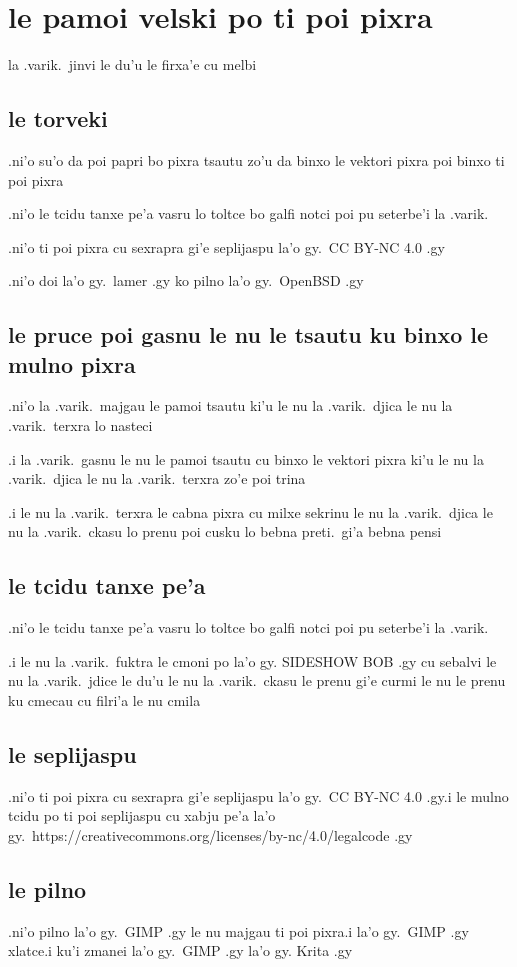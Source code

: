 \documentclass{report}
\begin{document}
\section{le pamoi velski po ti poi pixra}
la .varik.\ jinvi le du'u le firxa'e cu melbi
\subsection{le torveki}
.ni'o su'o da poi papri bo pixra tsautu zo'u da binxo le vektori pixra poi binxo ti poi pixra

.ni'o le tcidu tanxe pe'a vasru lo toltce bo galfi notci poi pu seterbe'i la .varik.

.ni'o ti poi pixra cu sexrapra gi'e seplijaspu la'o gy.\ CC BY-NC 4.0 .gy

.ni'o doi la'o gy.\ lamer .gy ko pilno la'o gy.\ OpenBSD .gy
\subsection{le pruce poi gasnu le nu le tsautu ku binxo le mulno pixra}
.ni'o la .varik.\ majgau le pamoi tsautu ki'u le nu la .varik.\ djica le nu la .varik.\ terxra lo nasteci

.i la .varik.\ gasnu le nu le pamoi tsautu cu binxo le vektori pixra ki'u le nu la .varik.\ djica le nu la .varik.\ terxra zo'e poi trina

.i le nu la .varik.\ terxra le cabna pixra cu milxe sekrinu le nu la .varik.\ djica le nu la .varik.\ ckasu lo prenu poi cusku lo bebna preti.\ gi'a bebna pensi
\subsection{le tcidu tanxe pe'a}
.ni'o le tcidu tanxe pe'a vasru lo toltce bo galfi notci poi pu seterbe'i la .varik.

.i le nu la .varik.\ fuktra le cmoni po la'o gy. SIDESHOW BOB .gy cu sebalvi le nu la .varik.\ jdice le du'u le nu la .varik.\ ckasu le prenu gi'e curmi le nu le prenu ku cmecau cu filri'a le nu cmila
\subsection{le seplijaspu}
.ni'o ti poi pixra cu sexrapra gi'e seplijaspu la'o gy.\ CC BY-NC 4.0 .gy\@ .i le mulno tcidu po ti poi seplijaspu cu xabju pe'a la'o gy.\ https://creativecommons.org/licenses/by-nc/4.0/legalcode .gy
\subsection{le pilno}
.ni'o pilno la'o gy.\ GIMP .gy le nu majgau ti poi pixra\@ .i  la'o gy.\ GIMP .gy xlatce\@ .i ku'i zmanei la'o gy.\ GIMP .gy la'o gy. Krita .gy
\end{document}
